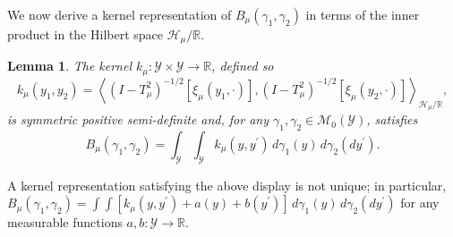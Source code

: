 \documentclass{article}
\theoremstyle{plain}
\newtheorem{lemma}[theorem]{Lemma}
\theoremstyle{definition}
\theoremstyle{remark}
\newcommand{\R}{\mathbb{R}}
\newcommand{\cH}{\mathcal{H}}
\newcommand{\cM}{\mathcal{M}}
\newcommand{\cY}{\mathcal{Y}}
\newcommand{\1}{\mathbbm{1}}
\newcommand{\iprod}[1]{\left\langle #1 \right\rangle}
\theoremstyle{plain}
\theoremstyle{definition}
\begin{document}
We now derive a kernel representation of $B_\mu(\gamma_1,\gamma_2)$ in terms of the inner product in the Hilbert space $\cH_\mu/\R$.

\begin{lemma}\label{lem:K_mu_kernel}
    The kernel $k_\mu: \cY \times \cY \to \R$, defined so
    \[
    k_\mu(y_1, y_2) = \iprod{(I - T_\mu^2)^{-1/2} [\xi_\mu(y_1, \cdot)], (I - T_\mu^2)^{-1/2} [\xi_\mu(y_2, \cdot)]}_{\cH_\mu / \R},
    \]
    is symmetric positive semi-definite and, for any $\gamma_1, \gamma_2 \in \cM_0(\cY)$, satisfies
    \[
    B_\mu(\gamma_1, \gamma_2) = \int_\cY \int_\cY k_\mu(y, y^\prime) \, d\gamma_1(y) \, d\gamma_2 (dy^\prime).
    \]
\end{lemma}
A kernel representation satisfying the above display is not unique; in particular, $B_\mu(\gamma_1, \gamma_2) = \int \int [k_\mu(y, y^\prime) + a(y) + b(y^\prime)] \, d\gamma_1(y) \, d\gamma_2 (dy^\prime)$ for any measurable functions $a, b: \cY \to \R$.
\end{document}
